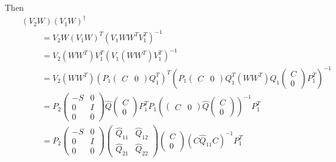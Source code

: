 \documentclass[final,leqno,onefignum,onetabnum]{siamltex1213}
\begin{document}
Then
\footnotesize
\begin{eqnarray}
&&\left(V_2W\right)\left(V_1W\right)^\dagger\nonumber\\
&&\hspace{1cm}=V_2W\left(V_1W\right)^T\left(V_1WW^TV_1^T\right)^{-1}\nonumber\\
&&\hspace{1cm}=V_2\left(WW^T\right)V_1^T\left(V_1\left(WW^T\right)V_1^T\right)^{-1}\nonumber\\
&&\hspace{1cm}=V_2\left(WW^T\right)\left(P_1\left(\begin{array}{cc} C&0\end{array}\right)Q_1^T\right)^T\left(P_1\left(\begin{array}{cc} C&0\end{array}\right)Q_1^T\left(WW^T\right)Q_1\left(\begin{array}{c} C\\ 0\end{array}\right)P_1^T\right)^{-1}\nonumber\\
&&\hspace{1cm}=P_2\left(\begin{array}{cc} -S & 0 \\ 0 & I \\ 0 & 0\end{array}\right)\widehat{Q}\left(\begin{array}{c} C \\ 0\end{array}\right)P_1^TP_1\left(\left(\begin{array}{cc} C & 0\end{array}\right)\widehat{Q}\left(\begin{array}{c} C \\ 0\end{array}\right)\right)^{-1}P_1^T\nonumber\\
&&\hspace{1cm}=P_2\left(\begin{array}{cc} -S & 0 \\ 0 & I \\ 0 & 0\end{array}\right)\left(\begin{array}{cc}\widehat{Q}_{11} & \widehat{Q}_{12} \\ \widehat{Q}_{21} & \widehat{Q}_{22}\end{array}\right)\left(\begin{array}{c} C \\ 0 \end{array}\right)\left(C\widehat{Q}_{11}C\right)^{-1}P_1^T\nonumber\\

\end{eqnarray}
\end{document}
